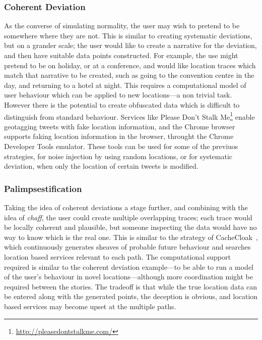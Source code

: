 \documentclass{IOS-Book-Article}     %
\newcommand{\tbox}[3][red]{{
\color{#1}\noindent{
   \fbox{\scriptsize{ {\bf #2} \textsl{#3}}}
   \vspace{2pt}
}
}}
\newcommand{\todo}[1]{\tbox{TODO:}{#1}}
\begin{document}
\subsubsection{Coherent Deviation}
As the converse of simulating normality, the user may wish to pretend to be
somewhere where they are not. 
This is similar
to creating systematic deviations, but on a grander scale; the user would like
to create a narrative for the deviation, and then have suitable data points
constructed. For example, the use might pretend to be on holiday, or at a
conference, and would like location traces which match that narrative to be
created, such as going to the convention centre in the day, and returning to a
hotel at night. This requires a computational model of user behaviour which can
be applied to new locations---a non trivial task. However there is the potential
to create obfuscated data which is difficult to distinguish from standard
behaviour. Services like Please Don't Stalk 
Me\footnote{\url{http://pleasedontstalkme.com/}} enable geotagging tweets 
with fake location information, and the Chrome browser supports faking location 
information in the browser, throught the Chrome Developer Tools emulator. These 
tools can be used for some of the previuos strategies, for noise injection by 
using random locations, or for systematic deviation, when only the location of 
certain tweets is modified.

\subsubsection{Palimpsestification}
Taking the idea of coherent deviations a stage further, and combining with the
idea of \emph{chaff}, the user could create multiple overlapping traces; each
trace would be locally coherent and plausible, but someone inspecting the data would have no way to know which is the real one.
This is similar to the strategy of 
CacheCloak~\cite{Meyerowitz:2009:HSF:1614320.1614358}, which
continuously generates sheaves of probable future behaviour and searches
location based services relevant to each  path. The computational support
required is similar to the coherent deviation example---to be able to run a
model of the user's behaviour in novel locations---although more coordination
might be required between the stories. The tradeoff is that while the true
location data can be entered along with the generated points, the deception is
obvious, and location based services may become upset at the multiple paths.
\end{document}
